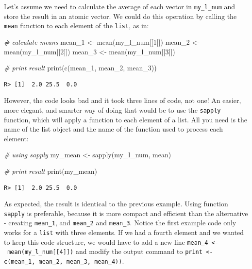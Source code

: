 \documentclass[
  12pt,
]{book}
\newenvironment{Shaded}{\begin{snugshade}}{\end{snugshade}}
\newcommand{\CommentTok}[1]{\textcolor[rgb]{0.37,0.37,0.37}{\textit{#1}}}
\newcommand{\DecValTok}[1]{\textcolor[rgb]{0.06,0.06,0.06}{#1}}
\newcommand{\FunctionTok}[1]{\textcolor[rgb]{0,0,0}{#1}}
\newcommand{\NormalTok}[1]{#1}
\newcommand{\OtherTok}[1]{\textcolor[rgb]{0.37,0.37,0.37}{#1}}
\begin{document}
Let's assume we need to calculate the average of each vector in \texttt{my\_l\_num} and store the result in an atomic vector. We could do this operation by calling the \texttt{mean} function to each element of the \texttt{list}, as in: 

\begin{Shaded}
\begin{Highlighting}[]
\CommentTok{\# calculate means}
\NormalTok{mean\_1 }\OtherTok{\textless{}{-}} \FunctionTok{mean}\NormalTok{(my\_l\_num[[}\DecValTok{1}\NormalTok{]])}
\NormalTok{mean\_2 }\OtherTok{\textless{}{-}} \FunctionTok{mean}\NormalTok{(my\_l\_num[[}\DecValTok{2}\NormalTok{]])}
\NormalTok{mean\_3 }\OtherTok{\textless{}{-}} \FunctionTok{mean}\NormalTok{(my\_l\_num[[}\DecValTok{3}\NormalTok{]])}

\CommentTok{\# print result}
\FunctionTok{print}\NormalTok{(}\FunctionTok{c}\NormalTok{(mean\_1, mean\_2, mean\_3))}
\end{Highlighting}
\end{Shaded}

\begin{verbatim}
R> [1]  2.0 25.5  0.0
\end{verbatim}

However, the code looks bad and it took three lines of code, not one! An easier, more elegant, and smarter way of doing that would be to use the \texttt{sapply} function, which will apply a function to each element of a list. All you need is the name of the list object and the name of the function used to process each element: 

\begin{Shaded}
\begin{Highlighting}[]
\CommentTok{\# using sapply}
\NormalTok{my\_mean }\OtherTok{\textless{}{-}} \FunctionTok{sapply}\NormalTok{(my\_l\_num, mean)}

\CommentTok{\# print result}
\FunctionTok{print}\NormalTok{(my\_mean)}
\end{Highlighting}
\end{Shaded}

\begin{verbatim}
R> [1]  2.0 25.5  0.0
\end{verbatim}

As expected, the result is identical to the previous example. Using function \texttt{sapply} is preferable, because it is more compact and efficient than the alternative - creating \texttt{mean\_1}, and \texttt{mean\_2} and \texttt{mean\_3}. Notice the first example code only works for a \texttt{list} with three elements. If we had a fourth element and we wanted to keep this code structure, we would have to add a new line \texttt{mean\_4\ \textless{}-\ mean(my\_l\_num{[}{[}4{]}{]})} and modify the output command to \texttt{print\ \textless{}-c(mean\_1,\ mean\_2,\ mean\_3,\ mean\_4))}.
\end{document}
